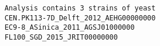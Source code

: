 \begin{verbatim}
    Analysis contains 3 strains of yeast
    CEN.PK113-7D_Delft_2012_AEHG00000000
    EC9-8_ASinica_2011_AGSJ01000000
    FL100_SGD_2015_JRIT00000000
\end{verbatim}


